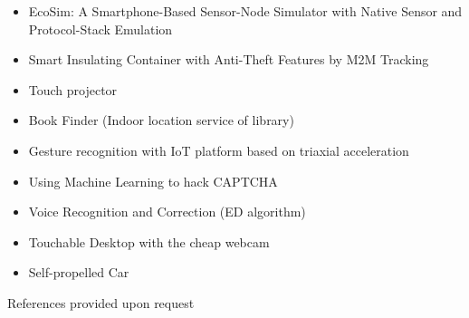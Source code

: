 \documentclass{res}
\begin{document}
\begin{resume}
\begin{itemize}[leftmargin=*]
					\item EcoSim: A Smartphone-Based Sensor-Node Simulator with Native Sensor and Protocol-Stack Emulation
					\vspace{-0.05in}
					
					\item Smart Insulating Container with Anti-Theft Features by M2M Tracking
					\vspace{-0.05in}
					
					\item Touch projector
					\vspace{-0.05in}
					
					\item Book Finder (Indoor location service of library)
					\vspace{-0.05in}
					
					\item Gesture recognition with IoT platform based on triaxial acceleration
					\vspace{-0.05in}
					
					\item Using Machine Learning to hack CAPTCHA	
					\vspace{-0.05in}
					
					\item Voice Recognition and Correction (ED algorithm)
					\vspace{-0.05in}
					
					\item Touchable Desktop with the cheap webcam
					\vspace{-0.05in}	

					\item Self-propelled Car
					\vspace{-0.05in}


			\end{itemize}
			
			\centerline{References provided upon request}
				          
		\end{resume}
	
\end{document}
